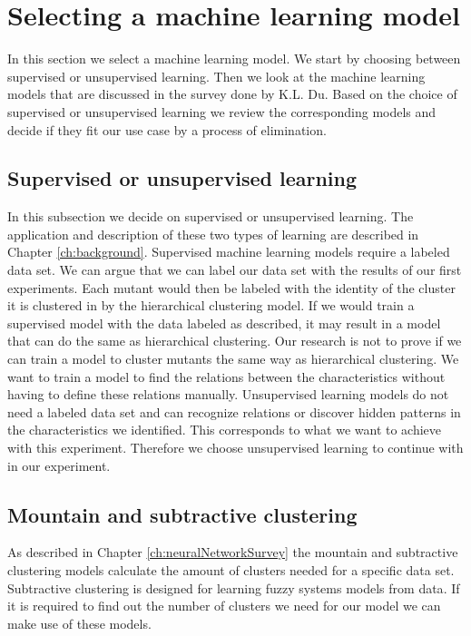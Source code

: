\documentclass[../../main]{subfiles}
\begin{document}
\section{Selecting a machine learning model}
In this section we select a machine learning model.
We start by choosing between supervised or unsupervised learning.
Then we look at the machine learning models that are discussed in the survey done by K.L. Du.
Based on the choice of supervised or unsupervised learning we review the corresponding models and decide if they fit our use case by a process of elimination.

\subsection{Supervised or unsupervised learning}
In this subsection we decide on supervised or unsupervised learning.
The application and description of these two types of learning are described in Chapter \ref{ch:background}.
\newline
Supervised machine learning models require a labeled data set.
We can argue that we can label our data set with the results of our first experiments.
Each mutant would then be labeled with the identity of the cluster it is clustered in by the hierarchical clustering model.
If we would train a supervised model with the data labeled as described, it may result in a model that can do the same as hierarchical clustering.
Our research is not to prove if we can train a model to cluster mutants the same way as hierarchical clustering.
We want to train a model to find the relations between the characteristics without having to define these relations manually.
\newline
Unsupervised learning models do not need a labeled data set and can recognize relations or discover hidden patterns in the characteristics we identified.
This corresponds to what we want to achieve with this experiment.
Therefore we choose unsupervised learning to continue with in our experiment.

\subsection{Mountain and subtractive clustering}
As described in Chapter \ref{ch:neuralNetworkSurvey} the mountain and subtractive clustering models calculate the amount of clusters needed for a specific data set.
Subtractive clustering is designed for learning fuzzy systems models from data\cite{Chiu1994FuzzyEstimation}. 
If it is required to find out the number of clusters we need for our model we can make use of these models.
\end{document}
